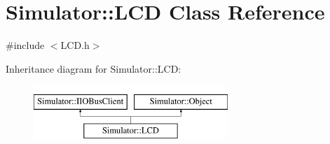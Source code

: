 \hypertarget{class_simulator_1_1_l_c_d}{\section{Simulator\+:\+:L\+C\+D Class Reference}
\label{class_simulator_1_1_l_c_d}
}


{\ttfamily \#include $<$L\+C\+D.\+h$>$}

Inheritance diagram for Simulator\+:\+:L\+C\+D\+:\begin{figure}[H]
\begin{center}
\leavevmode
\includegraphics[height=2.000000cm]{class_simulator_1_1_l_c_d}
\end{center}
\end{figure}
